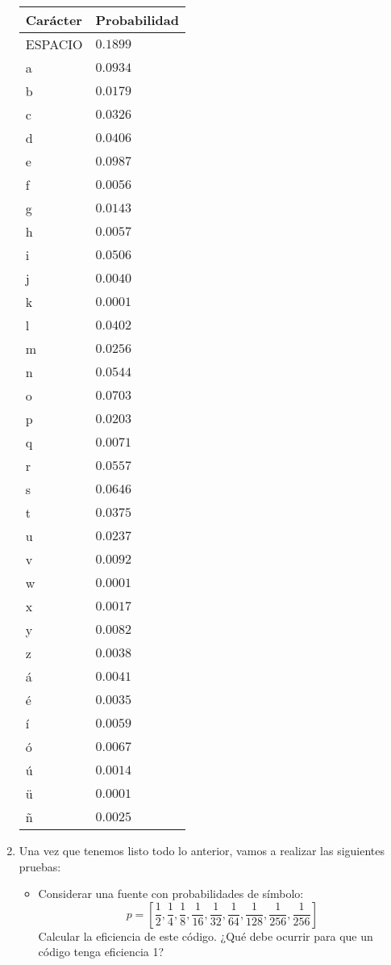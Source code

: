 \documentclass[es,practica]{uah}
\begin{document}
\begin{enumerate}
	\begin{center}
	\begin{tabular}{l|l}
	Carácter & Probabilidad \\
	\hline
	ESPACIO & $0.1899$\\
	a & $0.0934$\\
	b & $0.0179$\\
	c & $0.0326$\\
	d & $0.0406$\\
	\hline
	e & $0.0987$\\
	f & $0.0056$\\
	g & $0.0143$\\
	h & $0.0057$\\
	i & $0.0506$\\
	\hline
	j & $0.0040$\\
	k & $0.0001$\\
	l & $0.0402$\\
	m & $0.0256$\\
	n & $0.0544$\\
	\hline
	o & $0.0703$\\
	p & $0.0203$\\
	q & $0.0071$\\
	r & $0.0557$\\
	s & $0.0646$\\
	\hline
	t & $0.0375$\\
	u & $0.0237$\\
	v & $0.0092$\\
	w & $0.0001$\\
	x & $0.0017$\\
	\hline
	y & $0.0082$\\
	z & $0.0038$\\
	á & $0.0041$\\
	é & $0.0035$\\
	í & $0.0059$\\
	\hline
	ó & $0.0067$\\
	ú & $0.0014$\\
	ü & $0.0001$\\
	ñ & $0.0025$\\	
	\end{tabular}
\end{center}


\item Una vez que tenemos listo todo lo anterior, vamos a realizar las siguientes pruebas:

\begin{itemize}
	\item Considerar una fuente con probabilidades de símbolo:
	\begin{displaymath}
		p = \left [ \frac{1}{2}, \frac{1}{4}, \frac{1}{8}, \frac{1}{16}, \frac{1}{32}, \frac{1}{64}, \frac{1}{128}, \frac{1}{256}, \frac{1}{256} \right ]
	\end{displaymath}
Calcular la eficiencia de este código. ¿Qué debe ocurrir para que un código tenga eficiencia 1?


\end{itemize}
\end{enumerate}
\end{document}
